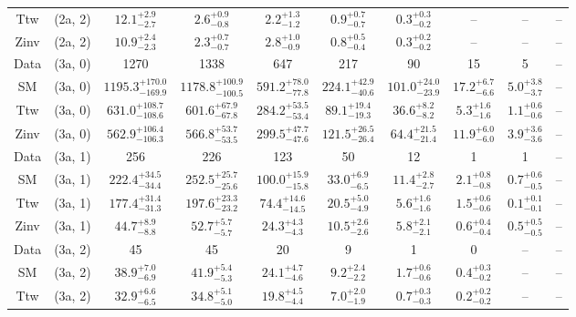 \begin{table}[h!]
{\begin{tabular}{cccccccccc}
	Ttw & (2a, 2) & $12.1^{+ 2.9 }_{- 2.7 }$ & $2.6^{+ 0.9 }_{- 0.8 }$ & $2.2^{+ 1.3 }_{- 1.2 }$ & $0.9^{+ 0.7 }_{- 0.7 }$ & $0.3^{+ 0.3 }_{- 0.2 }$ & -- & -- & -- \\[0.5ex] 
	Zinv & (2a, 2) & $10.9^{+ 2.4 }_{- 2.3 }$ & $2.3^{+ 0.7 }_{- 0.7 }$ & $2.8^{+ 1.0 }_{- 0.9 }$ & $0.8^{+ 0.5 }_{- 0.4 }$ & $0.3^{+ 0.2 }_{- 0.2 }$ & -- & -- & -- \\[0.5ex] 
	Data & (3a, 0) & 1270 & 1338 & 647 & 217 & 90 & 15 & 5 & -- \\[0.5ex] 
	SM & (3a, 0) & $1195.3^{+ 170.0 }_{- 169.9 }$ & $1178.8^{+ 100.9 }_{- 100.5 }$ & $591.2^{+ 78.0 }_{- 77.8 }$ & $224.1^{+ 42.9 }_{- 40.6 }$ & $101.0^{+ 24.0 }_{- 23.9 }$ & $17.2^{+ 6.7 }_{- 6.6 }$ & $5.0^{+ 3.8 }_{- 3.7 }$ & -- \\[0.5ex] 
	Ttw & (3a, 0) & $631.0^{+ 108.7 }_{- 108.6 }$ & $601.6^{+ 67.9 }_{- 67.8 }$ & $284.2^{+ 53.5 }_{- 53.4 }$ & $89.1^{+ 19.4 }_{- 19.3 }$ & $36.6^{+ 8.2 }_{- 8.2 }$ & $5.3^{+ 1.6 }_{- 1.6 }$ & $1.1^{+ 0.6 }_{- 0.6 }$ & -- \\[0.5ex] 
	Zinv & (3a, 0) & $562.9^{+ 106.4 }_{- 106.3 }$ & $566.8^{+ 53.7 }_{- 53.5 }$ & $299.5^{+ 47.7 }_{- 47.6 }$ & $121.5^{+ 26.5 }_{- 26.4 }$ & $64.4^{+ 21.5 }_{- 21.4 }$ & $11.9^{+ 6.0 }_{- 6.0 }$ & $3.9^{+ 3.6 }_{- 3.6 }$ & -- \\[0.5ex] 
	Data & (3a, 1) & 256 & 226 & 123 & 50 & 12 & 1 & 1 & -- \\[0.5ex] 
	SM & (3a, 1) & $222.4^{+ 34.5 }_{- 34.4 }$ & $252.5^{+ 25.7 }_{- 25.6 }$ & $100.0^{+ 15.9 }_{- 15.8 }$ & $33.0^{+ 6.9 }_{- 6.5 }$ & $11.4^{+ 2.8 }_{- 2.7 }$ & $2.1^{+ 0.8 }_{- 0.8 }$ & $0.7^{+ 0.6 }_{- 0.5 }$ & -- \\[0.5ex] 
	Ttw & (3a, 1) & $177.4^{+ 31.4 }_{- 31.3 }$ & $197.6^{+ 23.3 }_{- 23.2 }$ & $74.4^{+ 14.6 }_{- 14.5 }$ & $20.5^{+ 5.0 }_{- 4.9 }$ & $5.6^{+ 1.6 }_{- 1.6 }$ & $1.5^{+ 0.6 }_{- 0.6 }$ & $0.1^{+ 0.1 }_{- 0.1 }$ & -- \\[0.5ex] 
	Zinv & (3a, 1) & $44.7^{+ 8.9 }_{- 8.8 }$ & $52.7^{+ 5.7 }_{- 5.7 }$ & $24.3^{+ 4.3 }_{- 4.3 }$ & $10.5^{+ 2.6 }_{- 2.6 }$ & $5.8^{+ 2.1 }_{- 2.1 }$ & $0.6^{+ 0.4 }_{- 0.4 }$ & $0.5^{+ 0.5 }_{- 0.5 }$ & -- \\[0.5ex] 
	Data & (3a, 2) & 45 & 45 & 20 & 9 & 1 & 0 & -- & -- \\[0.5ex] 
	SM & (3a, 2) & $38.9^{+ 7.0 }_{- 6.9 }$ & $41.9^{+ 5.4 }_{- 5.3 }$ & $24.1^{+ 4.7 }_{- 4.6 }$ & $9.2^{+ 2.4 }_{- 2.2 }$ & $1.7^{+ 0.6 }_{- 0.6 }$ & $0.4^{+ 0.3 }_{- 0.2 }$ & -- & -- \\[0.5ex] 
	Ttw & (3a, 2) & $32.9^{+ 6.6 }_{- 6.5 }$ & $34.8^{+ 5.1 }_{- 5.0 }$ & $19.8^{+ 4.5 }_{- 4.4 }$ & $7.0^{+ 2.0 }_{- 1.9 }$ & $0.7^{+ 0.3 }_{- 0.3 }$ & $0.2^{+ 0.2 }_{- 0.2 }$ & -- & -- \\[0.5ex] 

\end{tabular}}
\end{table}
